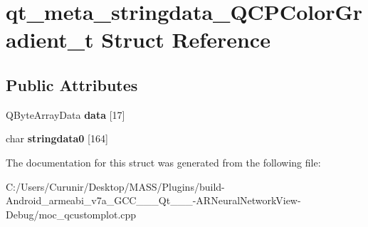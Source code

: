 \hypertarget{structqt__meta__stringdata___q_c_p_color_gradient__t}{}\section{qt\+\_\+meta\+\_\+stringdata\+\_\+\+Q\+C\+P\+Color\+Gradient\+\_\+t Struct Reference}
\label{structqt__meta__stringdata___q_c_p_color_gradient__t}
\subsection*{Public Attributes}
\begin{DoxyCompactItemize}
\item 
\mbox{\label{structqt__meta__stringdata___q_c_p_color_gradient__t_add4bc236a1bc750a3fb2d89a666118f2}} 
Q\+Byte\+Array\+Data {\bfseries data} \mbox{[}17\mbox{]}
\item 
\mbox{\label{structqt__meta__stringdata___q_c_p_color_gradient__t_afc23bc7bd6d55092378291189eff4ae1}} 
char {\bfseries stringdata0} \mbox{[}164\mbox{]}
\end{DoxyCompactItemize}


The documentation for this struct was generated from the following file\+:\begin{DoxyCompactItemize}
\item 
C\+:/\+Users/\+Curunir/\+Desktop/\+M\+A\+S\+S/\+Plugins/build-\/\+Android\+\_\+armeabi\+\_\+v7a\+\_\+\+G\+C\+C\+\_\+\_\+\_\+\+Qt\+\_\+\_\+\_-\/\+A\+R\+Neural\+Network\+View-\/\+Debug/moc\+\_\+qcustomplot.\+cpp\end{DoxyCompactItemize}
